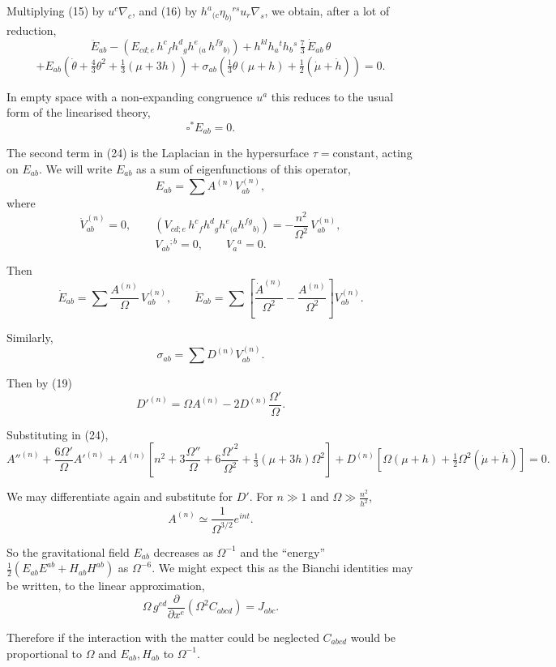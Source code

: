 Multiplying (15) by $u^{c}\nabla_{c}$, and (16) by 
$h^{a}{}_{(c}\eta_{b)}{}^{rs}u_{r}\nabla_{s}$, 
we obtain, after a lot of reduction,
\[
\ddot{E}_{ab} - \left( E_{cd;e}\, h^{c}{}_{f} h^{d}{}_{g} h^{e}{}_{(a}\, h^{fg}{}_{b)} \right)
+ h^{kl} h_{a}{}^{t} h_{b}{}^{s}\, \tfrac{7}{3}\,\dot{E}_{ab}\,\theta
\]
\[
+ E_{ab}\left(\dot{\theta} + \tfrac{4}{3}\theta^{2} + \tfrac{1}{3}(\mu + 3h)\right) 
+ \sigma_{ab}\left(\tfrac{1}{3}\theta(\mu+h) + \tfrac{1}{2}(\dot{\mu}+\dot{h})\right) = 0. \tag{24}
\]

In empty space with a non-expanding congruence $u^{a}$ this reduces to 
the usual form of the linearised theory,
\[
\square^{*} E_{ab} = 0.
\]

The second term in (24) is the Laplacian in the hypersurface 
$\tau = \text{constant}$, acting on $E_{ab}$. We will write $E_{ab}$ as a sum of 
eigenfunctions of this operator,
\[
E_{ab} = \sum A^{(n)} V_{ab}^{(n)},
\]
where
\[
\dot{V}_{ab}^{(n)} = 0, \qquad
\left( V_{cd;e}\, h^{c}{}_{f} h^{d}{}_{g} h^{e}{}_{(a} h^{fg}{}_{b)} \right)
= -\frac{n^{2}}{\Omega^{2}}\, V_{ab}^{(n)},
\]
\[
V_{ab}{}^{;b} = 0, \qquad V_{a}{}^{a} = 0.
\]

Then
\[
\dot{E}_{ab} = \sum \frac{A^{(n)}}{\Omega}\, V_{ab}^{(n)},
\qquad
\ddot{E}_{ab} = \sum \left[\frac{\dot{A}^{(n)}}{\Omega^{2}} 
- \frac{A^{(n)}}{\Omega^{2}}\right] V_{ab}^{(n)}.
\]

Similarly,
\[
\sigma_{ab} = \sum D^{(n)} V_{ab}^{(n)}.
\]

Then by (19)
\[
D'^{(n)} = \Omega A^{(n)} - 2D^{(n)}\frac{\Omega'}{\Omega}.
\]

Substituting in (24),
\[
A''^{(n)} + \frac{6\Omega'}{\Omega} A'^{(n)} + A^{(n)} 
\left[ n^{2} + 3\frac{\Omega''}{\Omega} + 6\frac{\Omega'^{2}}{\Omega^{2}} 
+ \tfrac{1}{3}(\mu + 3h)\Omega^{2}\right]
+ D^{(n)}\left[\Omega(\mu+h) + \tfrac{1}{2}\Omega^{2}(\dot{\mu}+\dot{h})\right] = 0.
\]

We may differentiate again and substitute for $D'$.  
For $n \gg 1$ and $\Omega \gg \tfrac{n^{2}}{h^{2}}$,
\[
A^{(n)} \simeq \frac{1}{\Omega^{3/2}} e^{i n t}.
\]

So the gravitational field $E_{ab}$ decreases as $\Omega^{-1}$ and the 
``energy'' $\tfrac{1}{2}(E_{ab}E^{ab} + H_{ab}H^{ab})$ as $\Omega^{-6}$.  
We might expect this as the Bianchi identities may be written, to the 
linear approximation,
\[
\Omega\, g^{ed} \frac{\partial}{\partial x^{e}}
\left(\Omega^{2} C_{abcd}\right) = J_{abc}.
\]

Therefore if the interaction with the matter could be neglected 
$C_{abcd}$ would be proportional to $\Omega$ and $E_{ab}, H_{ab}$ to $\Omega^{-1}$.

